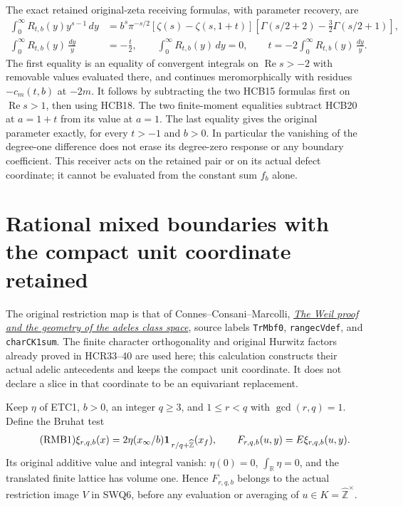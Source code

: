 \documentclass[11pt]{article}
\begin{document}
The exact retained original-zeta receiving formulas, with parameter
recovery, are
\begin{equation}\tag{HCB33}
\begin{split}
 \int_0^\infty R_{t,b}(y)y^{s-1}\,dy
  &=b^s\pi^{-s/2}[\zeta(s)-\zeta(s,1+t)]
       \left[\Gamma(s/2+2)-\frac32\Gamma(s/2+1)\right],\\
 \int_0^\infty R_{t,b}(y)\,\frac{dy}{y}&=-\frac t2,
 \qquad \int_0^\infty R_{t,b}(y)\,dy=0,\qquad
 t=-2\int_0^\infty R_{t,b}(y)\,\frac{dy}{y}.
\end{split}
\end{equation}
The first equality is an equality of convergent integrals on
$\operatorname{Re}s>-2$ with removable values evaluated there, and
continues meromorphically with residues $-c_m(t,b)$ at $-2m$.
It follows by subtracting the two HCB15 formulas first on
$\operatorname{Re}s>1$, then using HCB18. The two finite-moment
equalities subtract HCB20 at $a=1+t$ from its value at $a=1$.
The last equality gives the original parameter exactly, for every
$t>-1$ and $b>0$. In particular the vanishing of the degree-one
difference does not erase its degree-zero response or any boundary
coefficient. This receiver acts on the retained pair or on its
actual defect coordinate; it cannot be evaluated from the constant
sum $f_b$ alone.

\clearpage

\section{Rational mixed boundaries with the compact unit coordinate retained}
\label{sec:cc-rational-mixed-boundary}

The original restriction map is that of Connes--Consani--Marcolli,
\href{https://arxiv.org/abs/math/0703392v1}{\emph{The Weil proof and
the geometry of the adeles class space}}, source labels
\texttt{TrMbf0}, \texttt{rangecVdef}, and
\texttt{charCK1sum}. The finite character orthogonality and original
Hurwitz factors already proved in HCR33--40 are used here; this
calculation constructs their actual adelic antecedents and keeps
the compact unit coordinate. It does not declare a slice in that
coordinate to be an equivariant replacement.

Keep $\eta$ of ETC1, $b>0$, an integer $q\ge3$, and
$1\le r<q$ with $\gcd(r,q)=1$. Define the Bruhat test
\begin{equation}\tag{RMB1}
 \xi_{r,q,b}(x)=2\eta(x_\infty/b)
                    {\bf1}_{\,r/q+\widehat{\mathbb Z}}(x_f),
 \qquad F_{r,q,b}(u,y)=E\xi_{r,q,b}(u,y).
\end{equation}
Its original additive value and integral vanish:
$\eta(0)=0$, $\int_{\mathbb R}\eta=0$, and the translated
finite lattice has volume one. Hence $F_{r,q,b}$ belongs
to the actual restriction image $V$ in SWQ6, before any
evaluation or averaging of $u\in K=\widehat{\mathbb Z}^{\times}$.
\end{document}
